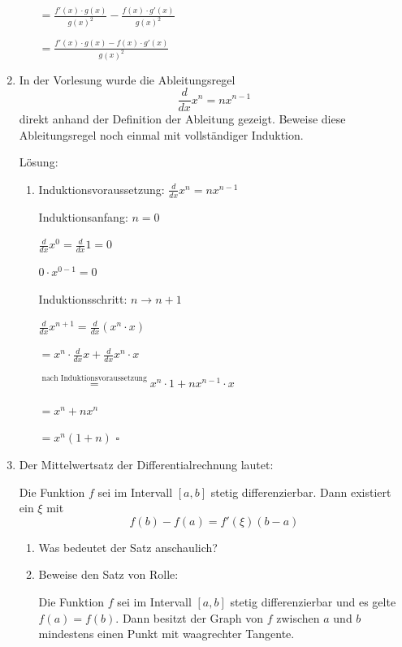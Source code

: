 \documentclass[main.tex]{subfiles}
\begin{document}
\begin{enumerate}
\begin{enumerate}
		            \( = \frac{f'(x) \cdot g(x) }{ g(x)^2 } - \frac{f(x) \cdot g'(x) }{ g(x)^2 } \)

		            \( = \frac{f'(x) \cdot g(x) - f(x) \cdot g'(x) }{ g(x)^2 } \)
	      \end{enumerate}
	\item In der Vorlesung wurde die Ableitungsregel
	      \[ \frac{d}{dx} x^n = nx^{n-1} \]
	      direkt anhand der Definition der Ableitung gezeigt. Beweise diese Ableitungsregel
	      noch einmal mit vollständiger Induktion.

	      Lösung:
	      \begin{enumerate}
		      \item Induktionsvoraussetzung:
		            \( \frac{d}{dx} x^n = nx^{n-1} \)

		            Induktionsanfang: \( n = 0 \)

		            \( \frac{d}{dx} x^0 = \frac{d}{dx} 1 = 0 \)

		            \( 0 \cdot x^{0 - 1} = 0 \)

		            Induktionsschritt: \( n \rightarrow n + 1 \)

		            \( \frac{d}{dx} x^{n+1} = \frac{d}{dx} ( x^{n} \cdot x )  \)

		            \( = x^n \cdot \frac{d}{dx} x + \frac{d}{dx} x^n \cdot x \)

		            \( \stackrel{\text{nach Induktionsvoraussetzung}}{=} x^n \cdot 1 + nx^{n-1} \cdot x\)

		            \( = x^n + nx^n \)

		            \( = x^n(1 + n) \)
		            \( \square \)
	      \end{enumerate}
	\item Der Mittelwertsatz der Differentialrechnung lautet:

	      Die Funktion \( f \) sei im Intervall \( [a,b] \) stetig differenzierbar.
	      Dann existiert ein \( \xi \) mit
	      \[ f(b) - f(a)  = f'( \xi )( b - a ) \]
	      \begin{enumerate}
		      \item Was bedeutet der Satz anschaulich?
		      \item Beweise den Satz von Rolle:

		            Die Funktion \( f \) sei im Intervall \( [a,b] \) stetig differenzierbar und
		            es gelte \( f(a) = f(b) \). Dann besitzt der Graph von \( f \) zwischen
		            \( a \) und \( b \) mindestens einen Punkt mit waagrechter Tangente.
	      \end{enumerate}


\end{enumerate}
\end{document}
